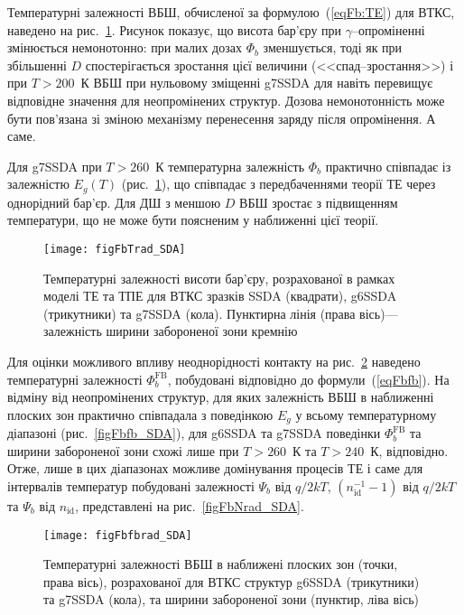 Температурні залежності ВБШ, обчисленої за формулою~(\ref{eqFb:TE}) для ВТКС, наведено на рис.~\ref{figFbTrad_SDA}.
Рисунок показує, що висота бар'єру при $\gamma$--опроміненні змінюється немонотонно:
при малих дозах $\Phi_b$ зменшується, тоді як при збільшенні $D$ спостерігається зростання цієї величини (<<спад--зростання>>) і
при $T>200$~К ВБШ при нульовому зміщенні g7SSDA для навіть перевищує відповідне значення для неопромінених структур.
Дозова немонотонність може бути пов'язана зі зміною механізму перенесення заряду після опромінення.
А саме.

Для g7SSDA при $T>260$~К температурна залежність $\Phi_b$ практично співпадає із залежністю $E_g(T)$ (рис.~\ref{figFbTrad_SDA}),
що співпадає з передбаченнями теорії ТЕ через однорідний бар'єр.
Для ДШ з меншою $D$ ВБШ зростає з підвищенням температури, що не може бути поясненим у наближенні цієї теорії.


\begin{figure}
\center
\texttt{[image: figFbTrad\_SDA]}
\caption{\label{figFbTrad_SDA}
Температурні залежності висоти бар'єру, розрахованої в рамках моделі ТЕ та ТПЕ
для ВТКС зразків SSDA (квадрати),
g6SSDA (трикутники) та g7SSDA (кола).
Пунктирна лінія (права вісь)--- залежність ширини забороненої зони кремнію
}%
\end{figure}


Для оцінки можливого впливу неоднорідності контакту на рис.~\ref{figFbfbrad_SDA} наведено температурні
залежності  $\Phi_{b}^\mathrm{FB}$, побудовані відповідно до формули~(\ref{eqFbfb}).
На відміну від неопромінених структур, для яких залежність ВБШ в наближенні плоских зон практично співпадала
з поведінкою $E_g$ у всьому температурному діапазоні (рис.~\ref{figFbfb_SDA}),
для g6SSDA  та g7SSDA поведінки $\Phi_{b}^\mathrm{FB}$ та ширини забороненої зони схожі лише при $T>260$~К та $T>240$~К, відповідно.
Отже, лише в цих діапазонах можливе домінування процесів ТЕ і саме для інтервалів температур побудовані
залежності $\Psi_b$ від $q/2kT$, $(n_\mathrm{id}^{-1}-1)$ від $q/2kT$ та $\Psi_b$ від $n_\mathrm{id}$,
представлені на
рис.~\ref{figFbNrad_SDA}.

\begin{figure}
\center
\texttt{[image: figFbfbrad\_SDA]}
\caption{\label{figFbfbrad_SDA}
Температурні залежності ВБШ в наближені плоских зон (точки, права вісь), розрахованої
для ВТКС структур
g6SSDA (трикутники) та g7SSDA (кола),
та ширини забороненої зони (пунктир, ліва вісь)
}%
\end{figure}



